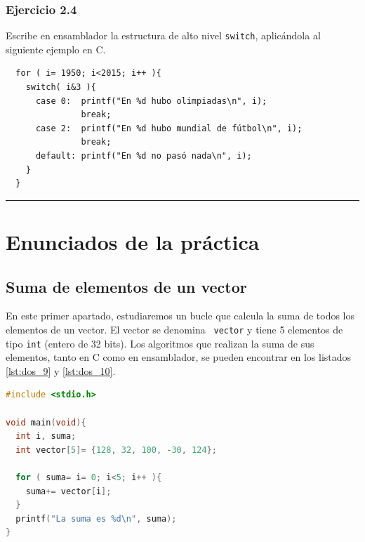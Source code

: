 \subsubsection{Ejercicio 2.4}

Escribe en ensamblador la estructura de alto nivel {\tt switch},
aplicándola al siguiente ejemplo en C.

\begin{center}
\begin{myfbox}
\small
\begin{minipage}{0.92\linewidth}
\begin{minipage}{0.6\linewidth}
\begin{verbatim}
  for ( i= 1950; i<2015; i++ ){
    switch( i&3 ){
      case 0:  printf("En %d hubo olimpiadas\n", i);
               break;
      case 2:  printf("En %d hubo mundial de fútbol\n", i);
               break;
      default: printf("En %d no pasó nada\n", i);
    }
  }
\end{verbatim}
\end{minipage}
\begin{center}
\colorbox[gray]{1}{\rule{0cm}{7cm}\rule{11cm}{0cm}}
\end{center}
\end{minipage}
\end{myfbox}
\end{center}

\section{Enunciados de la práctica}

\subsection{Suma de elementos de un vector}

En este primer apartado, estudiaremos un bucle que calcula la suma de
todos los elementos de un vector. El vector se denomina {\tt
vector} y tiene 5 elementos de tipo {\tt int} (entero de 32 bits). Los algoritmos
que realizan la suma de sus elementos, tanto en C como en ensamblador, se
pueden encontrar en los listados \ref{lst:dos_9} y \ref{lst:dos_10}.

\begin{lstlisting}[caption={Suma de elementos de un vector (tipos4.c)},label={lst:dos_9},language=C]
#include <stdio.h>

void main(void){
  int i, suma;
  int vector[5]= {128, 32, 100, -30, 124};

  for ( suma= i= 0; i<5; i++ ){
    suma+= vector[i];
  }
  printf("La suma es %d\n", suma);
}
\end{lstlisting}

